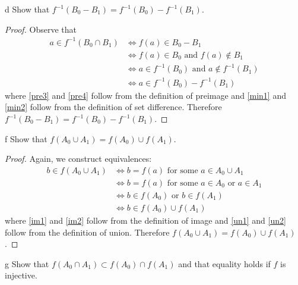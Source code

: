 \documentclass[11pt]{article}
\begin{document}
\begin{p}{d}
  Show that $f^{-1}(B_0 - B_1) = f^{-1}(B_0) - f^{-1}(B_1)$.
\end{p}

\begin{proof}
  Observe that
  \begin{align}
    a \in f^{-1}(B_0 \cap B_1)
      &\iff f(a) \in B_0 - B_1 \label{pre3} \\
      &\iff f(a) \in B_0 \text{ and } f(a) \notin B_1 \label{min1} \\
      &\iff a \in f^{-1}(B_0) \text{ and } a \notin f^{-1}(B_1) \label{pre4} \\
      &\iff a \in f^{-1}(B_0) - f^{-1}(B_1) \label{min2}
  \end{align}
  where \eqref{pre3} and \eqref{pre4} follow from the definition of preimage and
  \eqref{min1} and \eqref{min2} follow from the definition of set difference. Therefore
  $f^{-1}(B_0 - B_1) = f^{-1}(B_0) - f^{-1}(B_1)$.
\end{proof}

\begin{p}{f}
  Show that $f(A_0 \cup A_1) = f(A_0) \cup f(A_1)$.
\end{p}

\begin{proof}
  Again, we construct equivalences:
  \begin{align}
    b \in f(A_0 \cup A_1)
      &\iff b = f(a) \text{ for some } a \in A_0 \cup A_1 \label{im1} \\
      &\iff b = f(a) \text{ for some } a \in A_0 \text{ or } a \in A_1 \label{un1} \\
      &\iff b \in f(A_0) \text{ or } b \in f(A_1) \label{im2} \\
      &\iff b \in f(A_0) \cup f(A_1) \label{un2}
  \end{align}
  where \eqref{im1} and \eqref{im2} follow from the definition of image and
  \eqref{un1} and \eqref{un2} follow from the definition of union. Therefore
  $f(A_0 \cup A_1) = f(A_0) \cup f(A_1)$.
\end{proof}

\begin{p}{g}
  Show that $f(A_0 \cap A_1) \subset f(A_0) \cap f(A_1)$ and that equality
  holds if $f$ is injective.
\end{p}
\end{document}
